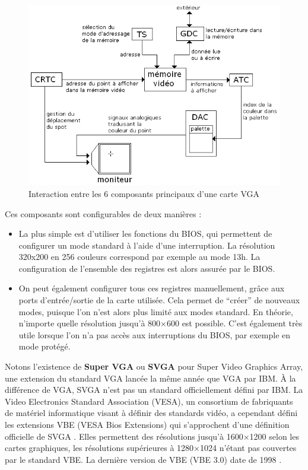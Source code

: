 \begin{figure}[H]
  \centering
    \includegraphics[width=14cm]{figures/vga}
  \caption{Interaction entre les 6 composants principaux d'une carte VGA}
  \label{fig:vga}
\end{figure}

Ces composants sont configurables de deux manières \cite{OSDev:VGA} :
\begin{itemize} \vspace{1ex} \itemsep1ex
 \item La plus simple est d'utiliser les fonctions du BIOS, qui permettent de configurer un mode standard à l'aide d'une interruption. La résolution 320x200 en 256 couleurs correspond par exemple au mode 13h. La configuration de l'ensemble des registres est alors assurée par le BIOS.
 \item On peut également configurer tous ces registres manuellement, grâce aux ports d'entrée/sortie de la carte utilisée. Cela permet de ``créer'' de nouveaux modes, puisque l'on n'est alors plus limité aux modes standard. En théorie, n'importe quelle résolution jusqu'à 800$\times$600 est possible. C'est également très utile lorsque l'on n'a pas accès aux interruptions du BIOS, par exemple en mode protégé.
\end{itemize}

\vspace{1em}

Notons l'existence de \textbf{Super VGA} ou \textbf{SVGA} pour Super Video Graphics Array, une extension du standard VGA lancée la même année que VGA par IBM. À la différence de VGA, SVGA n'est pas un standard officiellement défini par IBM. La Video Electronics Standard Association (VESA), un consortium de fabriquants de matériel informatique visant à définir des standards vidéo, a cependant défini les extensions VBE (VESA Bios Extensions) qui s'approchent d'une définition officielle de SVGA \cite{VBE2}. Elles permettent des résolutions jusqu'à 1600$\times$1200 selon les cartes graphiques, les résolutions supérieures à 1280$\times$1024 n'étant pas couvertes par le standard VBE. La dernière version de VBE (VBE 3.0) date de 1998 \cite{VBE3}.

